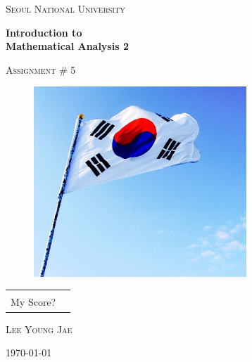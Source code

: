 \documentclass{article}
\begin{document}
\begin{titlepage}
\centering
{\scshape\LARGE Seoul National University \par}
\vspace{1.5cm}
{\huge\bfseries Introduction to\\Mathematical Analysis 2\par}
\vspace{1cm}
{\scshape\Large Assignment \# 5\par}

\vspace{1cm}

\begin{figure}[ht!]
\centering
\includegraphics[width=80mm]{pulruk.jpg}
\end{figure}

\vspace{1cm}

\arrayrulewidth=1.2pt
\begin{tabular}{p{2.5cm}p{2cm}}
\centering
& \\
\cline{2-2}
\vspace{-.73cm}
My Score? & \\
\end{tabular}



\vfill
{}
\vspace{.7cm}\par
\textsc{\large Lee Young Jae}
\vspace{.7cm}\par
{\Large \today\par}
\end{titlepage}

\setlength{\parindent}{0cm}
\end{document}
